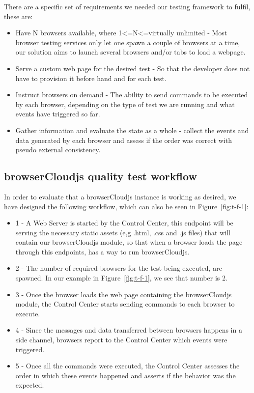 There are a specific set of requirements we needed our testing framework to fulfil, these are:

\begin{itemize}
    \item Have N browsers available, where 1\textless=N\textless=virtually unlimited - Most browser testing services only let one spawn a couple of browsers at a time, our solution aims to launch several browsers and/or tabs to load a webpage.
    \item Serve a custom web page for the desired test - So that the developer does not have to provision it before hand and for each test.
    \item Instruct browsers on demand - The ability to send commands to be executed by each browser, depending on the type of test we are running and what events have triggered so far.
    \item Gather information and evaluate the state as a whole - collect the events and data generated by each browser and assess if the order was correct with pseudo external consistency.
\end{itemize}

\subsection{browserCloudjs quality test workflow}

In order to evaluate that a browserCloudjs instance is working as desired, we have designed the following workflow, which can also be seen in Figure~\ref{fig:t-f-1}:

\begin{itemize}
    \item 1 - A Web Server is started by the Control Center, this endpoint will be serving the necessary static assets (e,g .html, .css and .js files) that will contain our browserCloudjs module, so that when a browser loads the page through this endpoints, has a way to run browserCloudjs.
    \item 2 - The number of required browsers for the test being executed, are spawned. In our example in Figure~\ref{fig:t-f-1}, we see that number is 2.
    \item 3 - Once the browser loads the web page containing the browserCloudjs module, the Control Center starts sending commands to each browser to execute.
    \item 4 - Since the messages and data transferred between browsers happens in a side channel, browsers report to the Control Center which events were triggered.
    \item 5 - Once all the commands were executed, the Control Center assesses the order in which these events happened and asserts if the behavior was the expected.
\end{itemize}


